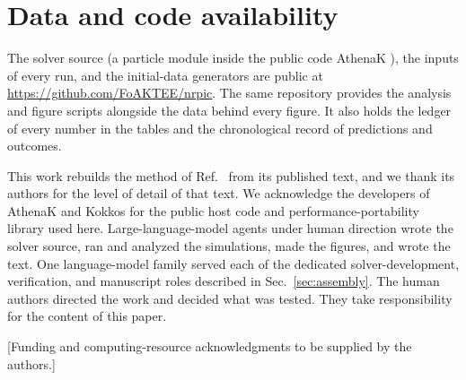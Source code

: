 \section*{Data and code availability}

The solver source (a particle module inside the public code AthenaK \cite{2026ApJS..283...27S,Zhu:2024utz}), the inputs of every run, and the initial-data generators are public at \url{https://github.com/FoAKTEE/nrpic}.
The same repository provides the analysis and figure scripts alongside the data behind every figure.
It also holds the ledger of every number in the tables and the chronological record of predictions and outcomes.

\begin{acknowledgments}
This work rebuilds the method of Ref.~\cite{Wu:2026nrpic} from its published text, and we thank its authors for the level of detail of that text.
We acknowledge the developers of AthenaK \cite{2026ApJS..283...27S,Zhu:2024utz} and Kokkos \cite{2022ITPDS..33..805T} for the public host code and performance-portability library used here.
Large-language-model agents under human direction wrote the solver source, ran and analyzed the simulations, made the figures, and wrote the text.
One language-model family served each of the dedicated solver-development, verification, and manuscript roles described in Sec.~\ref{sec:assembly}.
The human authors directed the work and decided what was tested.
They take responsibility for the content of this paper.

[Funding and computing-resource acknowledgments to be supplied by the authors.]
\end{acknowledgments}
